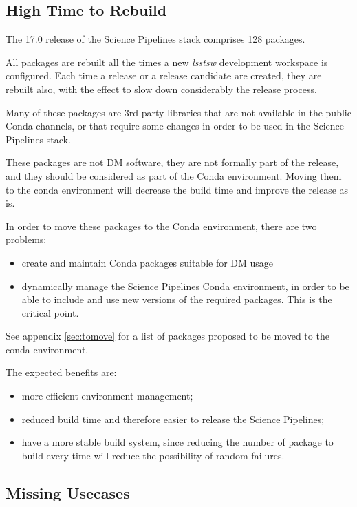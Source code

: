 \subsection{High Time to Rebuild} \label{sec:high}

The 17.0 release of the Science Pipelines stack comprises 128 packages.

All packages are rebuilt all the times a new \textit{lsstsw} development workspace is configured. 
Each time a release or a release candidate are created, they are rebuilt also, with the effect to slow down considerably the release process.

Many of these packages are 3rd party libraries that are not available in the public Conda channels, or that require some changes in order to be used in the Science Pipelines stack.

These packages are not DM software, they are not formally part of the release, and they should be considered as part of the Conda environment.
Moving them to the conda environment will decrease the build time and improve the release as is.

In order to move these packages to the Conda environment, there are two problems:

\begin{itemize}
\item create and maintain Conda packages suitable for DM usage
\item dynamically manage the Science Pipelines Conda environment, in order to be able to include and use new versions of the required packages. This is the critical point.
\end{itemize}

See appendix \ref{sec:tomove} for a list of packages proposed to be moved to the conda environment.

The expected benefits are:

\begin{itemize}
\item more efficient environment management;
\item reduced build time and therefore easier to release the Science Pipelines;
\item have a more stable build system, since reducing the number of package to build every time will reduce the possibility of random failures.
\end{itemize}


\subsection{Missing Usecases}

